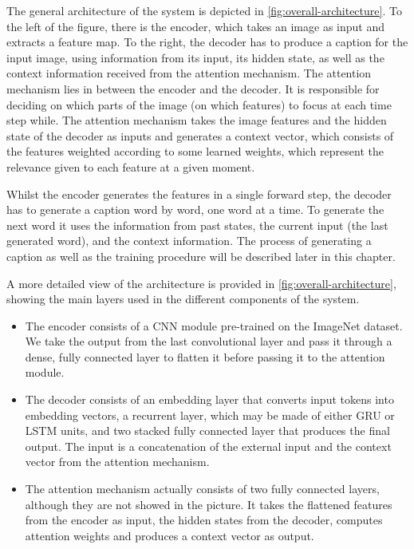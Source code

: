 The general architecture of the system is depicted in \cref{fig:overall-architecture}. To the left of the figure, there is the encoder, which takes an image as input and extracts a feature map. To the right, the decoder has to produce a caption for the input image, using information from its input, its hidden state, as well as the context information received from the attention mechanism. The attention mechanism lies in between the encoder and the decoder. It is responsible for deciding on which parts of the image (on which features) to focus at each time step while. The attention mechanism takes the image features and the hidden state of the decoder as inputs and generates a context vector, which consists of the features weighted according to some learned weights, which represent the relevance given to each feature at a given moment.

Whilst the encoder generates the features in a single forward step, the decoder has to generate a caption word by word, one word at a time. To generate the next word it uses the information from past states, the current input (the last generated word), and the context information. The process of generating a caption as well as the training procedure will be described later in this chapter.

A more detailed view of the architecture is provided in \cref{fig:overall-architecture}, showing the main layers used in the different components of the system. 
\begin{itemize}
    \item The encoder consists of a CNN module pre-trained on the ImageNet dataset. We take the output from the last convolutional layer and pass it through a dense, fully connected layer to flatten it before passing it to the attention module. 
    \item The decoder consists of an embedding layer that converts input tokens into embedding vectors, a recurrent layer, which may be made of either GRU or LSTM units, and two stacked fully connected layer that produces the final output. The input is a concatenation of the external input and the context vector from the attention mechanism.
    \item The attention mechanism actually consists of two fully connected layers, although they are not showed in the picture. It takes the flattened features from the encoder as input, the hidden states from the decoder, computes attention weights and produces a context vector as output.
\end{itemize}


